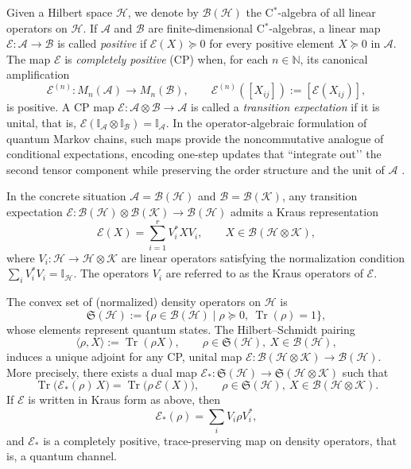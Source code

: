 \documentclass[11pt,a4paper]{article}
\begin{document}
Given a Hilbert space $\mathcal{H}$, we denote by $\mathcal{B}(\mathcal{H})$ the
C$^{*}$-algebra of all linear operators on $\mathcal{H}$.
If $\mathcal{A}$ and $\mathcal{B}$ are finite-dimensional C$^{*}$-algebras, a linear map
$\mathcal{E}:\mathcal{A}\to\mathcal{B}$ is called \emph{positive} if
$\mathcal{E}(X)\succeq 0$ for every positive element $X\succeq 0$ in $\mathcal{A}$.
The map $\mathcal{E}$ is \emph{completely positive} (CP) when, for each $n\in\mathbb{N}$,
its canonical amplification
\[
\mathcal{E}^{(n)}:M_{n}(\mathcal{A})\longrightarrow M_{n}(\mathcal{B}),
\qquad
\mathcal{E}^{(n)}([X_{ij}]) := [\mathcal{E}(X_{ij})],
\]
is positive. A CP map $\mathcal{E}:\mathcal{A}\otimes\mathcal{B}\to\mathcal{A}$ is called a
\emph{transition expectation} if it is unital, that is,
\(
\mathcal{E}(\mathbb{I}_{\mathcal{A}}\otimes\mathbb{I}_{\mathcal{B}})=\mathbb{I}_{\mathcal{A}}.
\)
In the operator-algebraic formulation of quantum Markov chains, such maps
provide the noncommutative analogue of conditional expectations, encoding
one-step updates that “integrate out’’ the second tensor component while
preserving the order structure and the unit of $\mathcal{A}$ \cite{BR}.

In the concrete situation $\mathcal{A}=\mathcal{B}(\mathcal{H})$ and
$\mathcal{B}=\mathcal{B}(\mathcal{K})$, any transition expectation
$\mathcal{E}:\mathcal{B}(\mathcal{H})\otimes\mathcal{B}(\mathcal{K})\to\mathcal{B}(\mathcal{H})$
admits a Kraus representation
\[
\mathcal{E}(X) = \sum_{i=1}^{r} V_{i}^{*} X V_{i},
\qquad
X\in\mathcal{B}(\mathcal{H}\otimes\mathcal{K}),
\]
where $V_{i}:\mathcal{H}\to\mathcal{H}\otimes\mathcal{K}$ are linear operators satisfying
the normalization condition $\sum_{i} V_{i}^{*}V_{i} = \mathbb{I}_{\mathcal{H}}$.
The operators $V_{i}$ are referred to as the Kraus operators of $\mathcal{E}$.


The convex set of (normalized) density operators on $\mathcal{H}$ is
\[
\mathfrak{S}(\mathcal{H})
:=
\bigl\{\rho\in\mathcal{B}(\mathcal{H})
\;\big|\;
\rho\succeq 0,\ \operatorname{Tr}(\rho)=1\bigr\},
\]
whose elements represent quantum states. The Hilbert–Schmidt pairing
\[
\langle\rho,X\rangle
:=
\operatorname{Tr}(\rho X),
\qquad
\rho\in\mathfrak{S}(\mathcal{H}),\ X\in\mathcal{B}(\mathcal{H}),
\]
induces a unique adjoint for any CP, unital map
$\mathcal{E}:\mathcal{B}(\mathcal{H}\otimes\mathcal{K})\to\mathcal{B}(\mathcal{H})$.
More precisely, there exists a dual map
$\mathcal{E}_{*}:\mathfrak{S}(\mathcal{H})\to\mathfrak{S}(\mathcal{H}\otimes\mathcal{K})$
such that
\begin{equation}\label{eq_HS}
\operatorname{Tr}\!\bigl(\mathcal{E}_{*}(\rho)\,X\bigr)
=
\operatorname{Tr}\!\bigl(\rho\,\mathcal{E}(X)\bigr),
\qquad
\rho\in\mathfrak{S}(\mathcal{H}),\ X\in\mathcal{B}(\mathcal{H}\otimes\mathcal{K}).
\end{equation}
If $\mathcal{E}$ is written in Kraus form as above, then
\[
\mathcal{E}_{*}(\rho)
=
\sum_{i} V_{i}\rho V_{i}^{*},
\]
and $\mathcal{E}_{*}$ is a completely positive, trace-preserving map on density
operators, that is, a quantum channel.
\end{document}
